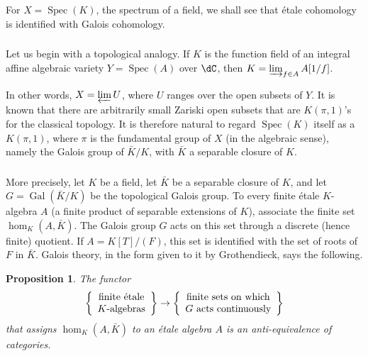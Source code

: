 \documentclass[12pt,oneside,english]{smfbook}
\DeclareMathOperator{\gal}{Gal}
\DeclareMathOperator{\spec}{Spec}
\newtheorem{proposition}[subsubsection]{Proposition}
\begin{document}
For $X=\spec(K)$, the spectrum of a field, we shall see that étale cohomology is identified with Galois cohomology.

\subsubsection{}\label{I:2-4-1}

Let us begin with a topological analogy. If $K$ is the function field of an integral affine algebraic variety $Y=\spec(A)$ over $\dC$, then $K=\varinjlim_{f\in A} A[1/f]$.

In other words, $X=\varprojlim U$, where $U$ ranges over the open subsets of $Y$. It is known that there are arbitrarily small Zariski open subsets that are $K(\pi,1)$'s for the classical topology. It is therefore natural to regard $\spec(K)$ itself as a $K(\pi,1)$, where $\pi$ is the fundamental group of $X$ (in the algebraic sense), namely the Galois group of $\bar K/K$, with $\bar K$ a separable closure of $K$.

\subsubsection{}\label{I:2-4-2}

More precisely, let $K$ be a field, let $\bar K$ be a separable closure of $K$, and let $G=\gal(\bar K/K)$ be the topological Galois group. To every finite étale $K$-algebra $A$ (a finite product of separable extensions of $K$), associate the finite set $\hom_K(A,\bar K)$. The Galois group $G$ acts on this set through a discrete (hence finite) quotient. If $A=K[T]/(F)$, this set is identified with the set of roots of $F$ in $\bar K$. Galois theory, in the form given to it by Grothendieck, says the following.

\begin{proposition}\label{I:2-4-3}
The functor
\[
  \left\{\begin{array}{c}
          \textnormal{finite étale} \\
          \textnormal{$K$-algebras}
        \end{array}\right\}
  \to
  \left\{\begin{array}{c}
          \textnormal{finite sets on which} \\
          \textnormal{$G$ acts continuously}
        \end{array}\right\}
\]
that assigns $\hom_K(A,\bar K)$ to an étale algebra $A$ is an anti-equivalence of categories.
\end{proposition}
\end{document}
